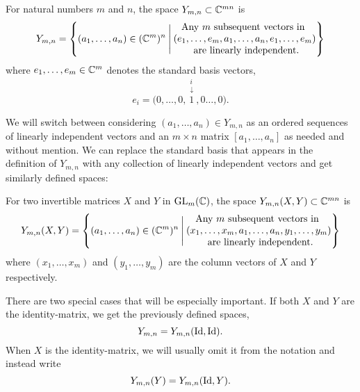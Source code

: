 \begin{definition}
  For natural numbers $m$ and $n$, the space $Y_{m,n}\subset \mathbb{C}^{mn}$
  is
  \[ Y_{m,n} = \left\{ (a_1,\dots,a_n) \in (\mathbb{C}^m)^n \:\Bigg\vert\:
    \begin{matrix}
      \text{Any } m \text{ subsequent vectors in } \\
      (e_1,\dots,e_m,a_1,\dots,a_n,e_1,\dots,e_m) \\
      \text{ are linearly independent.}
    \end{matrix}  \right\} \]
  where $e_1,\dots,e_m \in \mathbb{C}^m$ denotes the standard basis
  vectors,
  \[ e_i =
  \big(0,\dots,0,\overset{\substack{i\\\downarrow}}{1},0\dots,0\big).\]

\end{definition}
We will switch between considering $(a_1,\dots,a_n)\in Y_{m,n}$ as an
ordered sequences of linearly independent vectors and an $m\times n$
matrix $[a_1,\dots,a_n]$ as needed and without mention. We can replace
the standard basis that appears in the definition of $Y_{m,n}$ with
any collection of linearly independent vectors and get similarly
defined spaces: 
\begin{definition}
  For two invertible matrices $X$ and $Y$ in
  $\mathrm{GL}_m(\mathbb{C})$, the space $Y_{m,n}(X,Y) \subset \mathbb{C}^{mn}$ is
  \[ Y_{m,n}(X,Y) = \left\{ (a_1,\dots,a_n) \in (\mathbb{C}^m)^n
    \:\Bigg\vert\: 
    \begin{matrix}
      \text{Any } m \text{ subsequent vectors in } \\
      (x_1,\dots,x_m,a_1,\dots,a_n,y_1,\dots,y_m) \\
      \text{ are linearly independent.}
    \end{matrix}  \right\} \]
  where $(x_1,\dots,x_m)$ and $(y_1,\dots,y_m)$ are the column vectors
  of $X$ and $Y$ respectively.
  
  There are two special cases that will be especially important.
  If both $X$ and $Y$ are the identity-matrix, we get the previously
  defined spaces,
  \[ Y_{m,n} = Y_{m,n}(\operatorname{Id},\operatorname{Id}). \]
  When $X$ is the identity-matrix, we will usually omit it from the
  notation and instead write
  \[ Y_{m,n}(Y) = Y_{m,n}(\operatorname{Id},Y). \]
\end{definition}

